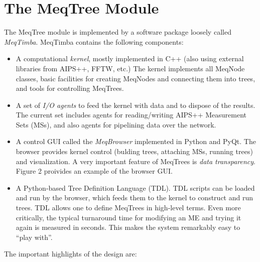 \documentclass[11pt,twoside]{article}  %
\begin{document}
\section{The MeqTree Module}

The MeqTree module is implemented by a software package loosely called {\em
MeqTimba}. MeqTimba contains the following components:

\begin{itemize}

\item A computational {\em kernel}, mostly implemented in C++ (also using
external libraries from AIPS++, FFTW, etc.) The kernel implements all MeqNode
classes,  basic facilities for creating MeqNodes and connecting them into trees,
and tools for controlling MeqTrees. 

\item A set of {\em I/O agents} to feed the kernel with data and to dispose of
the results. The current set includes agents for reading/writing AIPS++
Measurement Sets (MSs), and also agents for pipelining data over the network.

\item A control GUI called the {\em MeqBrowser} implemented in Python and PyQt.
The browser provides kernel control (bulding trees, attaching MSs, running
trees) and visualization. A very important feature of MeqTrees is {\em data
transparency}. Figure 2 proivides an example of the browser GUI.

\item A Python-based Tree Definition Language (TDL). TDL scripts can be loaded
and run by the browser, which feeds them to the kernel to construct and run
trees. TDL allows one to define MeqTrees in high-level terms. Even more
critically, the typical turnaround time for modifying an ME and trying it again
is measured in seconds. This makes the system remarkably easy to ``play with''. 

\end{itemize}

The important highlights of the design are:
\end{document}
